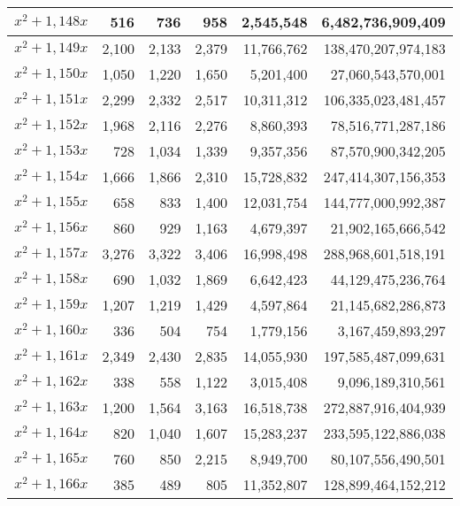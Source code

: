 \documentclass[a4paper]{amsproc}
\theoremstyle{plain}
\begin{document}
\begin{longtable}{ | l | r | r | r | r | r | }
$x^2 + 1{,}148x$ & 516 & 736 & 958 & 2{,}545{,}548 & 6{,}482{,}736{,}909{,}409 \\ \hline
$x^2 + 1{,}149x$ & 2{,}100 & 2{,}133 & 2{,}379 & 11{,}766{,}762 & 138{,}470{,}207{,}974{,}183 \\ \hline
$x^2 + 1{,}150x$ & 1{,}050 & 1{,}220 & 1{,}650 & 5{,}201{,}400 & 27{,}060{,}543{,}570{,}001 \\ \hline
$x^2 + 1{,}151x$ & 2{,}299 & 2{,}332 & 2{,}517 & 10{,}311{,}312 & 106{,}335{,}023{,}481{,}457 \\ \hline
$x^2 + 1{,}152x$ & 1{,}968 & 2{,}116 & 2{,}276 & 8{,}860{,}393 & 78{,}516{,}771{,}287{,}186 \\ \hline
$x^2 + 1{,}153x$ & 728 & 1{,}034 & 1{,}339 & 9{,}357{,}356 & 87{,}570{,}900{,}342{,}205 \\ \hline
$x^2 + 1{,}154x$ & 1{,}666 & 1{,}866 & 2{,}310 & 15{,}728{,}832 & 247{,}414{,}307{,}156{,}353 \\ \hline
$x^2 + 1{,}155x$ & 658 & 833 & 1{,}400 & 12{,}031{,}754 & 144{,}777{,}000{,}992{,}387 \\ \hline
$x^2 + 1{,}156x$ & 860 & 929 & 1{,}163 & 4{,}679{,}397 & 21{,}902{,}165{,}666{,}542 \\ \hline
$x^2 + 1{,}157x$ & 3{,}276 & 3{,}322 & 3{,}406 & 16{,}998{,}498 & 288{,}968{,}601{,}518{,}191 \\ \hline
$x^2 + 1{,}158x$ & 690 & 1{,}032 & 1{,}869 & 6{,}642{,}423 & 44{,}129{,}475{,}236{,}764 \\ \hline
$x^2 + 1{,}159x$ & 1{,}207 & 1{,}219 & 1{,}429 & 4{,}597{,}864 & 21{,}145{,}682{,}286{,}873 \\ \hline
$x^2 + 1{,}160x$ & 336 & 504 & 754 & 1{,}779{,}156 & 3{,}167{,}459{,}893{,}297 \\ \hline
$x^2 + 1{,}161x$ & 2{,}349 & 2{,}430 & 2{,}835 & 14{,}055{,}930 & 197{,}585{,}487{,}099{,}631 \\ \hline
$x^2 + 1{,}162x$ & 338 & 558 & 1{,}122 & 3{,}015{,}408 & 9{,}096{,}189{,}310{,}561 \\ \hline
$x^2 + 1{,}163x$ & 1{,}200 & 1{,}564 & 3{,}163 & 16{,}518{,}738 & 272{,}887{,}916{,}404{,}939 \\ \hline
$x^2 + 1{,}164x$ & 820 & 1{,}040 & 1{,}607 & 15{,}283{,}237 & 233{,}595{,}122{,}886{,}038 \\ \hline
$x^2 + 1{,}165x$ & 760 & 850 & 2{,}215 & 8{,}949{,}700 & 80{,}107{,}556{,}490{,}501 \\ \hline
$x^2 + 1{,}166x$ & 385 & 489 & 805 & 11{,}352{,}807 & 128{,}899{,}464{,}152{,}212 \\ \hline

\end{longtable}
\end{document}
